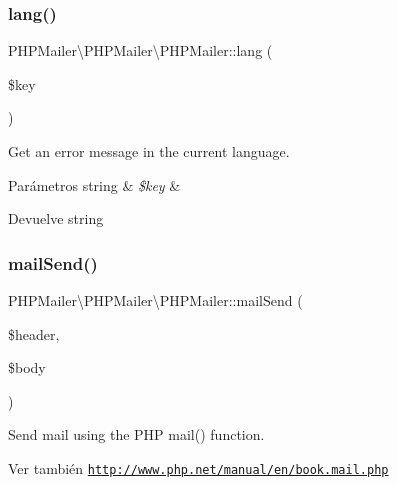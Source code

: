 \subsubsection{\texorpdfstring{lang()}{lang()}}
{\footnotesize\ttfamily P\+H\+P\+Mailer\textbackslash{}\+P\+H\+P\+Mailer\textbackslash{}\+P\+H\+P\+Mailer\+::lang (\begin{DoxyParamCaption}\item[{}]{\$key }\end{DoxyParamCaption})\hspace{0.3cm}{\ttfamily [protected]}}

Get an error message in the current language.


\begin{DoxyParams}[1]{Parámetros}
string & {\em \$key} & \\
\hline
\end{DoxyParams}
\begin{DoxyReturn}{Devuelve}
string 
\end{DoxyReturn}
\mbox{\label{classPHPMailer_1_1PHPMailer_1_1PHPMailer_a5380946f99759aa0cd61066638f8ba27}} 
\subsubsection{\texorpdfstring{mail\+Send()}{mailSend()}}
{\footnotesize\ttfamily P\+H\+P\+Mailer\textbackslash{}\+P\+H\+P\+Mailer\textbackslash{}\+P\+H\+P\+Mailer\+::mail\+Send (\begin{DoxyParamCaption}\item[{}]{\$header,  }\item[{}]{\$body }\end{DoxyParamCaption})\hspace{0.3cm}{\ttfamily [protected]}}

Send mail using the P\+HP mail() function.

\begin{DoxySeeAlso}{Ver también}
\href{http://www.php.net/manual/en/book.mail.php}{\tt http\+://www.\+php.\+net/manual/en/book.\+mail.\+php}
\end{DoxySeeAlso}

